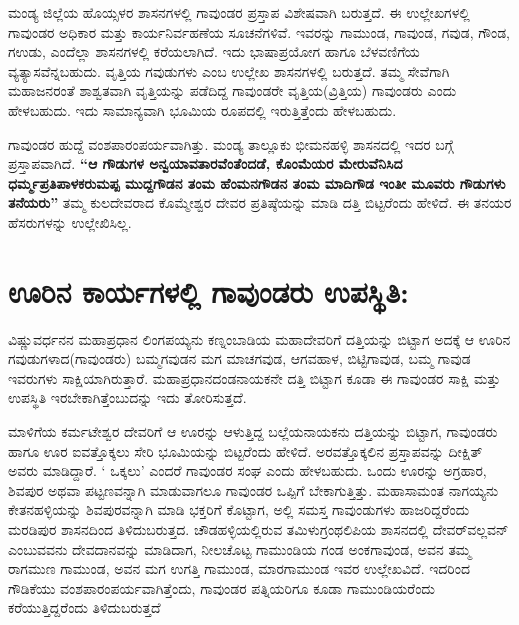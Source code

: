 ಮಂಡ್ಯ ಜಿಲ್ಲೆಯ ಹೊಯ್ಸಳರ ಶಾಸನಗಳಲ್ಲಿ ಗಾವುಂಡರ ಪ್ರಸ್ತಾಪ ವಿಶೇಷವಾಗಿ ಬರುತ್ತದೆ. ಈ ಉಲ್ಲೇಖಗಳಲ್ಲಿ ಗಾವುಂಡರ ಅಧಿಕಾರ ಮತ್ತು ಕಾರ್ಯನಿರ್ವಹಣೆಯ ಸೂಚನೆಗಳಿವೆ. ಇವರನ್ನು ಗಾಮುಂಡ, ಗಾವುಂಡ, ಗವುಡ, ಗೌಂಡ, ಗಉಡು, ಎಂದೆಲ್ಲಾ ಶಾಸನಗಳಲ್ಲಿ ಕರೆಯಲಾಗಿದೆ. ಇದು ಭಾಷಾಪ್ರಯೋಗ ಹಾಗೂ ಬೆಳವಣಿಗೆಯ ವ್ಯತ್ಯಾಸವೆನ್ನಬಹುದು. ವೃತ್ತಿಯ ಗವುಡುಗಳು ಎಂಬ ಉಲ್ಲೇಖ ಶಾಸನಗಳಲ್ಲಿ ಬರುತ್ತದೆ. ತಮ್ಮ ಸೇವೆಗಾಗಿ ಮಹಾಜನರಂತೆ ಶಾಶ್ವತವಾಗಿ ವೃತ್ತಿಯನ್ನು ಪಡೆದಿದ್ದ ಗಾವುಂಡರೇ ವೃತ್ತಿಯ(ವ್ರಿತ್ತಿಯ) ಗಾವುಂಡರು ಎಂದು ಹೇಳಬಹುದು. ಇದು ಸಾಮಾನ್ಯವಾಗಿ ಭೂಮಿಯ ರೂಪದಲ್ಲಿ ಇರುತ್ತಿತ್ತೆಂದು ಹೇಳಬಹುದು.

ಗಾವುಂಡರ ಹುದ್ದೆ ವಂಶಪಾರಂಪರ್ಯವಾಗಿತ್ತು. ಮಂಡ್ಯ ತಾಲ್ಲೂಕು ಭೀಮನಹಳ್ಳಿ ಶಾಸನದಲ್ಲಿ ಇದರ ಬಗ್ಗೆ ಪ್ರಸ್ತಾಪವಾಗಿದೆ. \textbf{“ಆ ಗೌಡುಗಳ ಅನ್ವಯಾವತಾರವೆಂತೆಂದಡೆ, ಕೊಂಮೆಯರ ಮೇರುವೆನಿಸಿದ ಧರ್ಮ್ಮಪ್ರತಿಪಾಳಕರುಮಪ್ಪ ಮುದ್ದಗೌಡನ ತಂಮ ಹೆಂಮನಗೌಡನ ತಂಮ ಮಾದಿಗೌಡ ಇಂತೀ ಮೂವರು ಗೌಡುಗಳು ತನೆಯರು”} ತಮ್ಮ ಕುಲದೇವರಾದ ಕೊಮ್ಮೇಶ್ವರ ದೇವರ ಪ್ರತಿಷ್ಠೆಯನ್ನು ಮಾಡಿ ದತ್ತಿ ಬಿಟ್ಟರೆಂದು ಹೇಳಿದೆ. ಈ ತನಯರ ಹೆಸರುಗಳನ್ನು ಉಲ್ಲೇಖಿಸಿಲ್ಲ.


\section{ಊರಿನ ಕಾರ್ಯಗಳಲ್ಲಿ ಗಾವುಂಡರು ಉಪಸ್ಥಿತಿ:}

ವಿಷ್ಣುವರ್ಧನನ ಮಹಾಪ್ರಧಾನ ಲಿಂಗಪಯ್ಯನು ಕಣ್ನಂಬಾಡಿಯ ಮಹಾದೇವರಿಗೆ ದತ್ತಿಯನ್ನು ಬಿಟ್ಟಾಗ ಅದಕ್ಕೆ ಆ ಊರಿನ ಗವುಡುಗಳಾದ(ಗಾವುಂಡರು) ಬಮ್ಮಗವುಡನ ಮಗ ಮಾಚಗವುಡ, ಆಗವಹಾಳ, ಬಿಟ್ಟಿಗಾವುಡ, ಬಮ್ಮ ಗಾವುಡ ಇವರುಗಳು ಸಾಕ್ಷಿಯಾಗಿರುತ್ತಾರೆ. ಮಹಾಪ್ರಧಾನದಂಡನಾಯಕನೇ ದತ್ತಿ ಬಿಟ್ಟಾಗ ಕೂಡಾ ಈ ಗಾವುಂಡರ ಸಾಕ್ಷಿ ಮತ್ತು ಉಪಸ್ಥಿತಿ ಇರಬೇಕಾಗಿತ್ತೆಂಬುದನ್ನು ಇದು ತೋರಿಸುತ್ತದೆ.

\vskip 2pt

ಮಾಳಿಗೆಯ ಕರ್ಮಟೇಶ್ವರ ದೇವರಿಗೆ ಆ ಊರನ್ನು ಆಳುತ್ತಿದ್ದ ಬಲ್ಲೆಯನಾಯಕನು ದತ್ತಿಯನ್ನು ಬಿಟ್ಟಾಗ, ಗಾವುಂಡರು ಹಾಗೂ ಊರ ಐವತ್ತೊಕ್ಕಲು ಸೇರಿ ಭೂಮಿಯನ್ನು ಬಿಟ್ಟರೆಂದು ಹೇಳಿದೆ. ಅರವತ್ತೊಕ್ಕಲಿನ ಪ್ರಸ್ತಾಪವನ್ನು ದೀಕ್ಷಿತ್​ ಅವರು ಮಾಡಿದ್ದಾರೆ. ` ಒಕ್ಕಲು' ಎಂದರೆ ಗಾವುಂಡರ ಸಂಘ ಎಂದು ಹೇಳಬಹುದು. ಒಂದು ಊರನ್ನು ಅಗ್ರಹಾರ, ಶಿವಪುರ ಅಥವಾ ಪಟ್ಟಣವನ್ನಾಗಿ ಮಾಡುವಾಗಲೂ ಗಾವುಂಡರ ಒಪ್ಪಿಗೆ ಬೇಕಾಗುತ್ತಿತ್ತು. ಮಹಾಸಾಮಂತ ನಾಗಯ್ಯನು ಕೇತನಹಳ್ಳಿಯನ್ನು ಶಿವಪುರವನ್ನಾಗಿ ಮಾಡಿ ಭಕ್ತರಿಗೆ ಕೊಟ್ಟಾಗ, ಅಲ್ಲಿ ಸಮಸ್ತ ಗಾವುಂಡುಗಳು ಹಾಜರಿದ್ದರೆಂದು ಮರಡಿಪುರ ಶಾಸನದಿಂದ ತಿಳಿದುಬರುತ್ತದ. ಚೌಡಹಳ್ಳಿಯಲ್ಲಿರುವ ತಮಿಳುಗ್ರಂಥಲಿಪಿಯ ಶಾಸನದಲ್ಲಿ ದೇವರ್​ವಲ್ಲವನ್​ ಎಂಬುವವನು ದೇವದಾನವನ್ನು ಮಾಡಿದಾಗ, ನೀಲಚೊಟ್ಟ ಗಾಮುಂಡಿಯ ಗಂಡ ಅಂಕಗಾವುಂಡ, ಅವನ ತಮ್ಮ ರಾಗಮುಣ ಗಾಮುಂಡ, ಅವನ ಮಗ ಉಗತ್ತಿ ಗಾಮುಂಡ, ಮಾರಗಾಮುಂಡ ಇವರ ಉಲ್ಲೇಖವಿದೆ. ಇದರಿಂದ ಗೌಡಿಕೆಯು ವಂಶಪಾರಂಪರ್ಯವಾಗಿತ್ತೆಂದು, ಗಾವುಂಡರ ಪತ್ನಿಯರಿಗೂ ಕೂಡಾ ಗಾಮುಂಡಿಯರೆಂದು ಕರೆಯುತ್ತಿದ್ದರೆಂದು ತಿಳಿದುಬರುತ್ತದೆ


